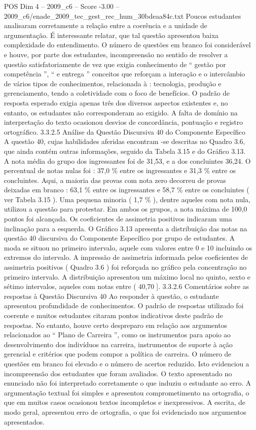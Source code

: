 \begin{textsample}{POS Dim 4 – 2009\_c6 – Score -3.00 – 2009\_c6/enade\_2009\_tec\_gest\_rec\_hum\_30bdeaa84c.txt}
Poucos estudantes analisaram corretamente a relação entre a coerência e a unidade de argumentação.
É interessante relatar, que tal questão apresentou baixa complexidade do entendimento.
O número de questões em branco foi considerável e houve, por parte dos estudantes, incompreensão no sentido de resolver a questão satisfatoriamente de vez que exigia conhecimento de “ gestão por competência ”, “ e entrega ” conceitos que reforçam a interação e o intercâmbio de vários tipos de conhecimentos, relacionada à : tecnologia, produção e gerenciamento, tendo a coletividade com o foco de benefícios.
O padrão de resposta esperado exigia apenas três dos diversos aspectos existentes e, no entanto, os estudantes não corresponderam ao exigido.
A falta de domínio na interpretação do texto ocasionou desvios de concordância, pontuação e registro ortográfico. 3.3.2.5 Análise da Questão Discursiva 40 do Componente Específico A questão 40, cujas habilidades aferidas encontram -se descritas no Quadro 3.6, que ainda contém outras informações, seguido da Tabela 3.15 e do Gráfico 3.13.
A nota média do grupo dos ingressantes foi de 31,53, e a dos concluintes 36,24.
O percentual de notas nulas foi : 37,0 \% entre os ingressantes e 31,3 \% entre os concluintes.
Aqui, a maioria das provas com nota zero decorreu de provas deixadas em branco : 63,1 \% entre os ingressantes e 58,7 \% entre os concluintes ( ver Tabela 3.15 ).
Uma pequena minoria ( 1,7 \% ), dentre aqueles com nota nula, utilizou a questão para protestar.
Em ambos os grupos, a nota máxima de 100,0 pontos foi alcançada.
Os coeficientes de assimetria positivos indicaram uma inclinação para a esquerda.
O Gráfico 3.13 apresenta a distribuição das notas na questão 40 discursiva do Componente Específico por grupo de estudantes.
A moda se situou no primeiro intervalo, aquele com valores entre 0 e 10 incluindo os extremos do intervalo.
A impressão de assimetria informada pelos coeficientes de assimetria positivos ( Quadro 3.6 ) foi reforçada no gráfico pela concentração no primeiro intervalo.
A distribuição apresentou um máximo local no quinto, sexto e sétimo intervalos, aqueles com notas entre ( 40,70 ]. 3.3.2.6 Comentários sobre as respostas à Questão Discursiva 40 Ao responder à questão, o estudante apresentou profundidade de conhecimentos.
O padrão de respostas utilizado foi coerente e muitos estudantes citaram pontos indicativos deste padrão de respostas.
No entanto, houve certo despreparo em relação aos argumentos relacionados ao “ Plano de Carreira ”, como os instrumentos para apoio ao desenvolvimento dos indivíduos na carreira, instrumentos de suporte à ação gerencial e critérios que podem compor a política de carreira.
O número de questões em branco foi elevado e o número de acertos reduzido.
Isto evidenciou a incompreensão dos estudantes que foram avaliados.
O texto apresentado no enunciado não foi interpretado corretamente o que induziu o estudante ao erro.
A argumentação textual foi simples e apresentou comprometimento na ortografia, o que em muitos casos ocasionou textos incompletos e inexpressivos.
A escrita, de modo geral, apresentou erro de ortografia, o que foi evidenciado nos argumentos apresentados.

\end{textsample}
